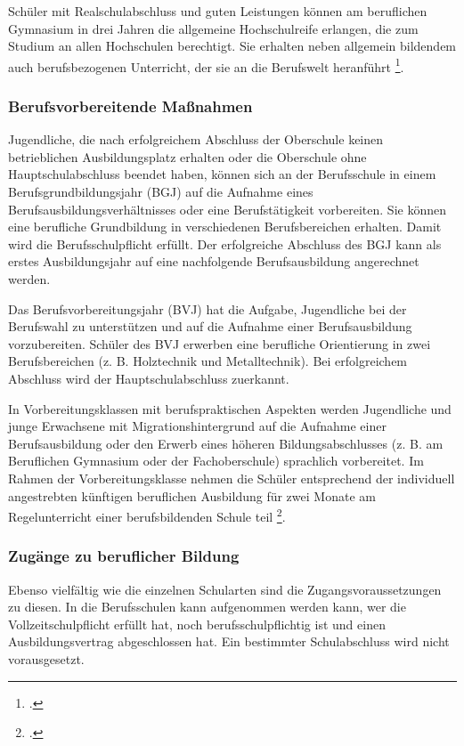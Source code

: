 Schüler mit Realschulabschluss und guten Leistungen können am beruflichen Gymnasium in drei Jahren die allgemeine Hochschulreife erlangen, die zum Studium an allen Hochschulen berechtigt. Sie erhalten neben allgemein bildendem auch berufsbezogenen Unterricht, der sie an die Berufswelt heranführt \footcites[vgl.]{SBSBSSSK2015}[vgl.][4ff]{SMKSK2013}.

\subsubsection{Berufsvorbereitende Maßnahmen}
\label{sec:BerufsvorbereitendeMassnahmen}

Jugendliche, die nach erfolgreichem Abschluss der Oberschule keinen betrieblichen Ausbildungsplatz erhalten oder die Oberschule ohne Hauptschulabschluss beendet haben, können sich an der Berufsschule in einem Berufsgrundbildungsjahr (BGJ) auf die Aufnahme eines Berufsausbildungsverhältnisses oder eine Berufstätigkeit vorbereiten. Sie können eine berufliche Grundbildung in verschiedenen Berufsbereichen erhalten. Damit wird die Berufsschulpflicht erfüllt. Der erfolgreiche Abschluss des BGJ kann als erstes Ausbildungsjahr auf eine nachfolgende Berufsausbildung angerechnet werden.

Das Berufsvorbereitungsjahr (BVJ) hat die Aufgabe, Jugendliche bei der Berufswahl zu unterstützen und auf die Aufnahme einer Berufsausbildung vorzubereiten. Schüler des BVJ erwerben eine berufliche Orientierung in zwei Berufsbereichen (z. B. Holztechnik und Metalltechnik). Bei erfolgreichem Abschluss wird der Hauptschulabschluss zuerkannt.

In Vorbereitungsklassen mit berufspraktischen Aspekten werden Jugendliche und junge Erwachsene mit Migrationshintergrund auf die Aufnahme einer Berufsausbildung oder den Erwerb eines höheren Bildungsabschlusses (z. B. am Beruflichen Gymnasium oder der Fachoberschule) sprachlich vorbereitet. Im Rahmen der Vorbereitungsklasse nehmen die Schüler entsprechend der individuell angestrebten künftigen beruflichen Ausbildung für zwei Monate am Regelunterricht einer berufsbildenden Schule teil \footcite[vgl.][15ff]{SMKSK2013}.

\subsubsection{Zugänge zu beruflicher Bildung}
\label{sec:ZugängeZuBeruflicherBildung}

Ebenso vielfältig wie die einzelnen Schularten sind die Zugangsvoraussetzungen zu diesen. In die Berufsschulen kann aufgenommen werden kann, wer die Vollzeitschulpflicht erfüllt hat, noch berufsschulpflichtig ist und einen Ausbildungsvertrag abgeschlossen hat. Ein bestimmter Schulabschluss wird nicht vorausgesetzt.

